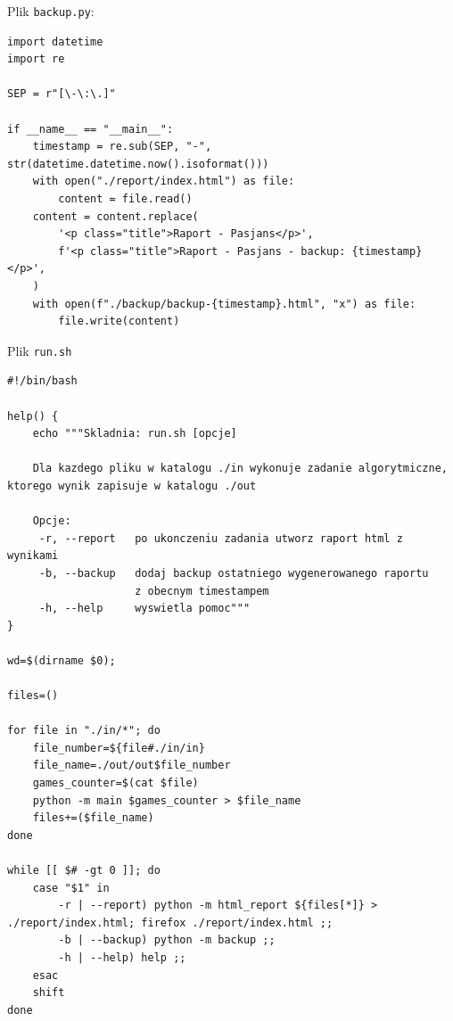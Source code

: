 \documentclass[12pt,a4paper]{article}
\begin{document}
Plik \texttt{backup.py}:
\begin{lstlisting}
import datetime
import re

SEP = r"[\-\:\.]"

if __name__ == "__main__":
    timestamp = re.sub(SEP, "-", str(datetime.datetime.now().isoformat()))
    with open("./report/index.html") as file:
        content = file.read()
    content = content.replace(
        '<p class="title">Raport - Pasjans</p>',
        f'<p class="title">Raport - Pasjans - backup: {timestamp}</p>',
    )
    with open(f"./backup/backup-{timestamp}.html", "x") as file:
        file.write(content)

\end{lstlisting}

Plik \texttt{run.sh}
\begin{lstlisting}
#!/bin/bash

help() {
    echo """Skladnia: run.sh [opcje]

    Dla kazdego pliku w katalogu ./in wykonuje zadanie algorytmiczne, ktorego wynik zapisuje w katalogu ./out

    Opcje:
     -r, --report   po ukonczeniu zadania utworz raport html z wynikami
     -b, --backup   dodaj backup ostatniego wygenerowanego raportu 
                    z obecnym timestampem
     -h, --help     wyswietla pomoc"""
}

wd=$(dirname $0);

files=()

for file in "./in/*"; do
    file_number=${file#./in/in}
    file_name=./out/out$file_number
    games_counter=$(cat $file)
    python -m main $games_counter > $file_name
    files+=($file_name)
done

while [[ $# -gt 0 ]]; do
    case "$1" in
        -r | --report) python -m html_report ${files[*]} > ./report/index.html; firefox ./report/index.html ;;
        -b | --backup) python -m backup ;;
        -h | --help) help ;;
    esac
    shift
done

\end{lstlisting}



\end{document}
